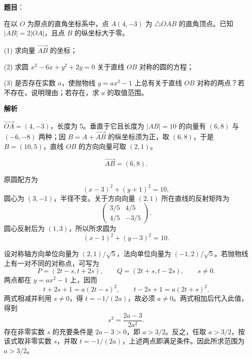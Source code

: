 \begin{answer}

\textbf{题目}：

在以 \(O\) 为原点的直角坐标系中，点 \(A(4,-3)\) 为 \(\triangle OAB\) 的直角顶点。已知 \(|AB|=2|OA|\)，且点 \(B\) 的纵坐标大于零。

    (1) 求向量 \(\overrightarrow{AB}\) 的坐标；

    (2) 求圆 \(x^2-6x+y^2+2y=0\) 关于直线 \(OB\) 对称的圆的方程；

    (3) 是否存在实数 \(a\)，使抛物线 \(y=ax^2-1\) 上总有关于直线 \(OB\) 对称的两点？若不存在，说明理由；若存在，求 \(a\) 的取值范围。

\textbf{解析}

\(\overrightarrow{OA}=(4,-3)\)，长度为 5。垂直于它且长度为 \(|AB|=10\) 的向量有 \((6,8)\) 与 \((-6,-8)\) 两种；因 \(B=A+\overrightarrow{AB}\) 的纵坐标须为正，取 \((6,8)\)，于是 \(B=(10,5)\)，直线 \(OB\) 的方向向量可取 \((2,1)\)。


\nopagebreak[4]
\[
\overrightarrow{AB}=(6,8).
\]


原圆配方为
\nopagebreak[4]
\[
(x-3)^2+(y+1)^2=10,
\]
圆心为 \((3,-1)\)，半径不变。关于方向向量 \((2,1)\) 所在直线的反射矩阵为
\nopagebreak[4]
\[
\begin{pmatrix}3/5&4/5\\4/5&-3/5\end{pmatrix}.
\]
圆心反射后为 \((1,3)\)，所以所求圆为
\nopagebreak[4]
\[
(x-1)^2+(y-3)^2=10.
\]


设对称轴方向单位向量为 \((2,1)/\sqrt5\)，法向单位向量为 \((-1,2)/\sqrt5\)。若抛物线上有一对不同的对称点，可写为
\nopagebreak[4]
\[
P=(2t-s,t+2s),\qquad Q=(2t+s,t-2s),\qquad s\ne0.
\]
两点都在 \(y=ax^2-1\) 上，因而
\nopagebreak[4]
\[
t+2s+1=a(2t-s)^2,\qquad t-2s+1=a(2t+s)^2.
\]
两式相减并利用 \(s\ne0\)，得 \(t=-1/(2a)\)，故必须 \(a\ne0\)。两式相加后代入此值，得到
\nopagebreak[4]
\[
s^2=\frac{2a-3}{2a^2}.
\]
存在非零实数 \(s\) 的充要条件是 \(2a-3>0\)，即 \(a>3/2\)。反之，任取 \(a>3/2\)，按该式取非零实数 \(s\)，并取 \(t=-1/(2a)\)，上述两点即满足条件。因此所求范围为 \(a>3/2\)。




\end{answer}
